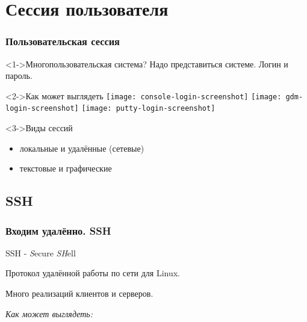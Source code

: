 \section{Сессия пользователя}

\begin{frame}
  \frametitle{Пользовательская сессия}

  \begin{center}
    \begin{block}<1->{Многопользовательская система?}
      Надо представиться системе. Логин и пароль.
    \end{block}

    \begin{block}<2->{Как может выглядеть}
      \texttt{[image: console-login-screenshot]}
      \texttt{[image: gdm-login-screenshot]}
      \texttt{[image: putty-login-screenshot]}
    \end{block}

    \begin{block}<3->{Виды сессий}
      \begin{itemize} 
	\item локальные и удалённые (сетевые)
	\item текстовые и графические
      \end{itemize}
    \end{block}

  \end{center}

\end{frame}

\subsection{SSH}

\begin{frame}
  \frametitle{Входим удалённо. SSH}

  \begin{center}

    SSH - \emph{S}ecure \emph{SH}ell
    \newline \pause

    Протокол удалённой работы по сети для Linux.

    Много реализаций клиентов и серверов. 
    \newline
    \pause

    \emph{Как может выглядеть:} 
    \newline
    \emph{ }
  \end{center} 

\end{frame}

